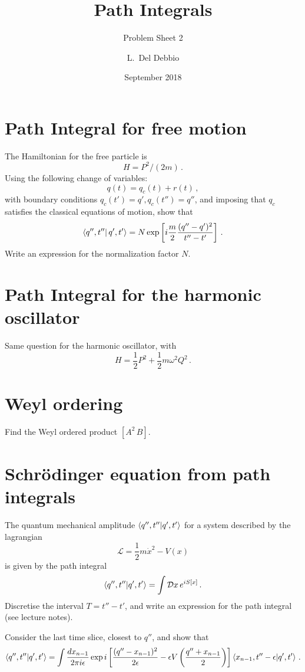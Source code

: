 \documentclass{tutorial}
\subtitle{Problem Sheet 2}
\title{Path Integrals}
\author{L.~Del Debbio}
\date{September 2018}
\begin{document}
\maketitle

  \section {Path Integral for free motion}

    The Hamiltonian for the free particle is 
    \[
      H = P^2/(2m)\, .
    \]
    Using the following change of variables:
    \[
      q(t) = q_c(t) + r(t)\, ,
    \]
    with boundary conditions $q_c(t')=q', q_c(t'')=q''$, and imposing
    that $q_c$ satisfies the classical equations of motion, show that
    \[
      \braket{q'',t''}{\,q',t'}=N \exp\left[i \frac{m}{2}
        \frac{(q''-q')^2}{t''-t'}\right]\, .
    \]
    Write an expression for the normalization factor $N$. 

     

  \section {Path Integral for the harmonic oscillator}

    Same question for the harmonic oscillator, with 
    \[
      H = \frac12 P^2 + \frac12 m \omega^2 Q^2\, .
    \]

     

  \section {Weyl ordering}

    Find the Weyl ordered product $[A^2\, B]$.

     

  \section {Schr\"odinger equation from path integrals}
    
    The quantum mechanical amplitude $\braket{q'',t''}{q',t'}$ for a
    system described by the lagrangian
    \[
      \mathcal{L} = \frac12 m \dot{x}^2 - V(x)
    \]
    is given by the path integral
    \[
      \braket{q'',t''}{q',t'} = \int \mathcal{D}x\, e^{i S[x]}\, .
    \]
    Discretise the interval $T=t''-t'$, and write an expression for
    the path integral (see lecture notes). 
    
    Consider the last time slice, closest to $q''$, and show that
    \[
      \braket{q'',t''}{q',t'} = \int \frac{dx_{n-1}}{2\pi i \epsilon} 
      \exp i \left[ 
        \frac{(q''-x_{n-1})^2}{2\epsilon} - \epsilon V\left(\frac{q''+x_{n-1}}{2}\right)
      \right]
       \braket{x_{n-1},t''-\epsilon}{q',t'}\, .
    \]
    
\end{document}
